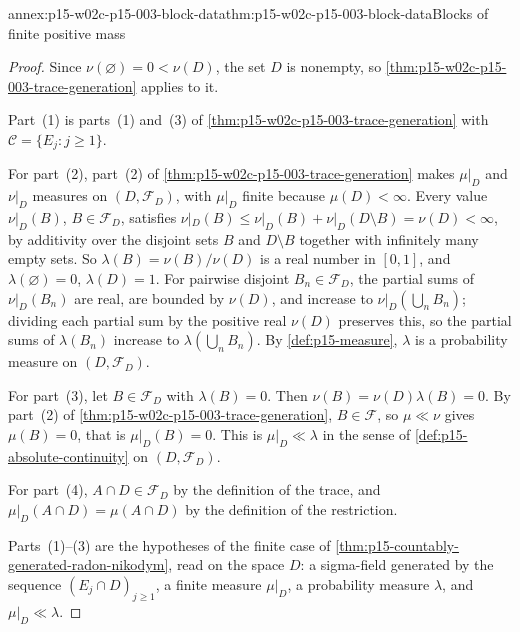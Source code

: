 \begin{annexitem}{annex:p15-w02c-p15-003-block-data}{thm:p15-w02c-p15-003-block-data}{Blocks of finite positive mass}
\begin{proof}
Since \(\nu(\varnothing)=0<\nu(D)\), the set \(D\) is nonempty, so
\cref{thm:p15-w02c-p15-003-trace-generation} applies to it.

Part~(1) is parts~(1) and~(3) of
\cref{thm:p15-w02c-p15-003-trace-generation} with
\(\mathcal C=\{E_j:j\geq1\}\).

For part~(2), part~(2) of \cref{thm:p15-w02c-p15-003-trace-generation}
makes \(\mu|_D\) and \(\nu|_D\) measures on \((D,\mathcal F_D)\), with
\(\mu|_D\) finite because \(\mu(D)<\infty\). Every value \(\nu|_D(B)\),
\(B\in\mathcal F_D\), satisfies
\(\nu|_D(B)\leq\nu|_D(B)+\nu|_D(D\setminus B)=\nu(D)<\infty\), by
additivity over the disjoint sets \(B\) and \(D\setminus B\) together with
infinitely many empty sets. So \(\lambda(B)=\nu(B)/\nu(D)\) is a real number
in \([0,1]\), and \(\lambda(\varnothing)=0\), \(\lambda(D)=1\). For
pairwise disjoint \(B_n\in\mathcal F_D\), the partial sums of
\(\nu|_D(B_n)\) are real, are bounded by \(\nu(D)\), and increase to
\(\nu|_D(\bigcup_nB_n)\); dividing each partial sum by the positive real
\(\nu(D)\) preserves this, so the partial sums of \(\lambda(B_n)\)
increase to \(\lambda(\bigcup_nB_n)\). By \cref{def:p15-measure},
\(\lambda\) is a probability measure on \((D,\mathcal F_D)\).

For part~(3), let \(B\in\mathcal F_D\) with \(\lambda(B)=0\). Then
\(\nu(B)=\nu(D)\lambda(B)=0\). By part~(2) of
\cref{thm:p15-w02c-p15-003-trace-generation}, \(B\in\mathcal F\), so
\(\mu\ll\nu\) gives \(\mu(B)=0\), that is \(\mu|_D(B)=0\). This is
\(\mu|_D\ll\lambda\) in the sense of \cref{def:p15-absolute-continuity}
on \((D,\mathcal F_D)\).

For part~(4), \(A\cap D\in\mathcal F_D\) by the definition of the trace,
and \(\mu|_D(A\cap D)=\mu(A\cap D)\) by the definition of the
restriction.

Parts~(1)--(3) are the hypotheses of the finite case of
\cref{thm:p15-countably-generated-radon-nikodym}, read on the space \(D\):
a sigma-field generated by the sequence \((E_j\cap D)_{j\geq1}\), a finite
measure \(\mu|_D\), a probability measure \(\lambda\), and
\(\mu|_D\ll\lambda\).
\end{proof}
\end{annexitem}

